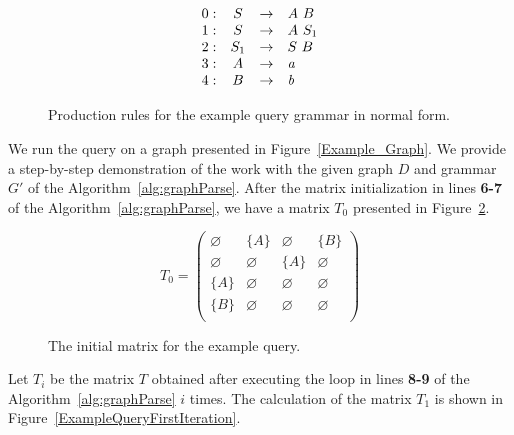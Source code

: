 \begin{figure}[h]
   \[
\begin{array}{rccl}
   0: & S & \rightarrow & A \ B \\
   1: & S & \rightarrow & A \ S_1 \\
   2: & S_1 & \rightarrow & S \ B \\
   3: & A & \rightarrow & \text{\textit{a}} \\ 
   4: & B & \rightarrow & \text{\textit{b}} \\ 
\end{array}
\]
\caption{Production rules for the example query grammar in normal form.}
\label{ProductionRulesExampleQueryCNF}
\end{figure}

We run the query on a graph presented in Figure~\ref{Example_Graph}. We provide a step-by-step demonstration of the work with the given graph $D$ and grammar $G'$ of the Algorithm~\ref{alg:graphParse}. After the matrix initialization in lines \textbf{6-7} of the Algorithm~\ref{alg:graphParse}, we have a matrix $T_0$ presented in Figure~\ref{ExampleQueryInitMatrix}.

\begin{figure}[h]
\[
T_0 = \begin{pmatrix}
    \varnothing & \{A\}       & \varnothing & \{B\}       \\
    \varnothing & \varnothing & \{A\}       & \varnothing \\
    \{A\}       & \varnothing & \varnothing & \varnothing \\
    \{B\}       & \varnothing & \varnothing & \varnothing \\
\end{pmatrix}
\]
\caption{The initial matrix for the example query.}
\label{ExampleQueryInitMatrix}
\end{figure}

Let $T_i$ be the matrix $T$ obtained after executing the loop in lines \textbf{8-9} of the Algorithm~\ref{alg:graphParse} $i$ times. The calculation of the matrix $T_1$ is shown in Figure~\ref{ExampleQueryFirstIteration}.


